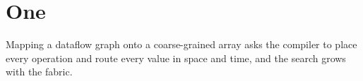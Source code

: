 \section{One}
Mapping a dataflow graph onto a coarse-grained array asks the compiler to place every operation and route every value in space and time, and the search grows with the fabric.
